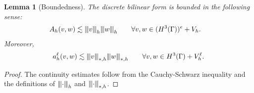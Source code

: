 \documentclass[10pt, a4paper]{amsart}
\newtheorem{lemma}[theorem]{Lemma}
\theoremstyle{definition}
\theoremstyle{remark}
\theoremstyle{example}
\numberwithin{equation}{section}
\newcommand{\tbar}[1]{{\left\vert\kern-0.25ex\left\vert\kern-0.25ex\left\vert #1 
    \right\vert\kern-0.25ex\right\vert\kern-0.25ex\right\vert}}
\begin{document}
\begin{lemma}[Boundedness]
The discrete bilinear form is bounded in the following sense:
\begin{align}
A_h(v, w)
& \lesssim \tbar{v}_{h}\tbar{w}_h \qquad \forall v, w \in (H^3(\Gamma))^e + V_h. \label{bdd1}
\end{align}
Moreover,
\begin{align} \label{bdd2}
a_h^\ell(v,w)\lesssim \tbar{v}_{*,h}\tbar{w}_{*,h}\qquad \forall v,w\in H^3(\Gamma)+V_h^\ell.
\end{align}

\end{lemma}
\begin{proof}
The continuity estimates follow from the Cauchy-Schwarz inequality and the definitions
of $\tbar{\cdot}_h$ and $\tbar{\cdot}_{*, h}$.




\end{proof}
\end{document}
